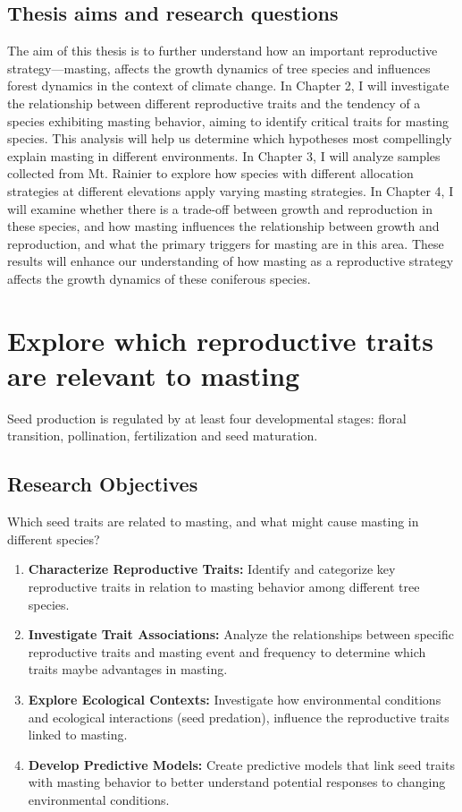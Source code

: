 \documentclass[11pt,letter]{article}
\begin{document}
\subsection{Thesis aims and research questions}
The aim of this thesis is to further understand how an important reproductive strategy—masting, affects the growth dynamics of tree species and influences forest dynamics in the context of climate change. In Chapter 2, I will investigate the relationship between different reproductive traits and the tendency of a species exhibiting masting behavior, aiming to identify critical traits for masting species. This analysis will help us determine which hypotheses most compellingly explain masting in different environments. In Chapter 3, I will analyze samples collected from Mt. Rainier to explore how species with different allocation strategies at different elevations apply varying masting strategies. In Chapter 4, I will examine whether there is a trade-off between growth and reproduction in these species,  and how masting influences the relationship between growth and reproduction, and what the primary triggers for masting are in this area. These results will enhance our understanding of how masting as a reproductive strategy affects the growth dynamics of these coniferous species.



\section{Explore which reproductive traits are relevant to masting}
Seed production is regulated by at least four developmental stages: floral transition, pollination, fertilization and seed maturation. 
\subsection{Research Objectives}
Which seed traits are related to masting, and what might cause masting in different species?
	\begin{enumerate}
	\item \textbf{Characterize Reproductive Traits:} Identify and categorize key reproductive traits in relation to masting behavior among different tree species.
	\item \textbf{Investigate Trait Associations:} Analyze the relationships between specific reproductive traits and masting event and frequency to determine which traits maybe advantages in masting.
	\item \textbf{Explore Ecological Contexts:} Investigate how environmental conditions and ecological interactions (seed predation), influence the reproductive traits linked to masting.
	\item \textbf{Develop Predictive Models:} Create predictive models that link seed traits with masting behavior to better understand potential responses to changing environmental conditions.
	\end{enumerate}
\end{document}
